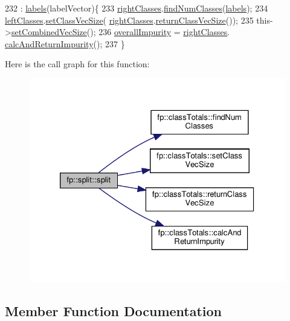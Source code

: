 \begin{DoxyCode}
232                                                   : \hyperlink{classfp_1_1split_a9658b163c2cd30e9900e21c3b1c3f2f9}{labels}(labelVector)\{
233                     \hyperlink{classfp_1_1split_af5366297f7de9b8ff0911186300bab7e}{rightClasses}.\hyperlink{classfp_1_1classTotals_a4d042d3a31d3f03d577bd4ad02bb5e6a}{findNumClasses}(\hyperlink{classfp_1_1split_a9658b163c2cd30e9900e21c3b1c3f2f9}{labels});
234                     \hyperlink{classfp_1_1split_a3be6dcf32281715e6376e9f5f8da18f0}{leftClasses}.\hyperlink{classfp_1_1classTotals_a026ec5ce8d0ad54702891c0d6ba51fc8}{setClassVecSize}(
      \hyperlink{classfp_1_1split_af5366297f7de9b8ff0911186300bab7e}{rightClasses}.\hyperlink{classfp_1_1classTotals_a088c363e5ae669d52e4836bc900d6a73}{returnClassVecSize}());
235                     this->\hyperlink{classfp_1_1split_a9c1560ae01a536ed0245d667ee7d5fb6}{setCombinedVecSize}();
236                     \hyperlink{classfp_1_1split_a1eba74d8afed2852da3eb004afe76bb7}{overallImpurity} = \hyperlink{classfp_1_1split_af5366297f7de9b8ff0911186300bab7e}{rightClasses}.
      \hyperlink{classfp_1_1classTotals_a94eaf5d719442de6f7014b0630932bb8}{calcAndReturnImpurity}();
237                 \}
\end{DoxyCode}
Here is the call graph for this function\+:\nopagebreak
\begin{figure}[H]
\begin{center}
\leavevmode
\includegraphics[width=326pt]{classfp_1_1split_aa4634b2460fcbe77440805d0526e72b6_cgraph}
\end{center}
\end{figure}


\subsection{Member Function Documentation}
\mbox{\label{classfp_1_1split_ac75c6034210f3c53ff3435e2d12377e1}} 
